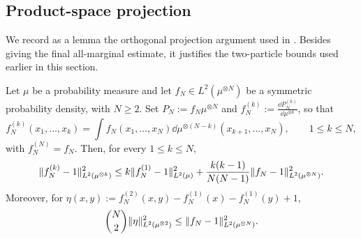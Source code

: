 \documentclass[11pt,reqno]{amsart}
\numberwithin{equation}{section}
\theoremstyle{plain}
\theoremstyle{remark}
\DeclarePairedDelimiter{\norm}{\lVert}{\rVert}
\begin{document}
\subsection{Product-space projection}
We record as a lemma the orthogonal projection argument used in \cite{DGRchaos}. Besides giving the final all-marginal estimate, it justifies the two-particle bounds used earlier in this section.

\begin{lemma}\label{lem:product-projection}
Let $\mu$ be a probability measure and let $f_N\in L^2(\mu^{\otimes N})$ be a symmetric probability density, with $N\ge2$. Set $P_N:=f_N\mu^{\otimes N}$ and $f_N^{(k)}:=\frac{\dd P_N^{(k)}}{\dd\mu^{\otimes k}}$, so that
\begin{equation}\label{eq:projection-marginal-identities}
 f_N^{(k)}(x_1,\ldots,x_k)
 =\int f_N(x_1,\ldots,x_N)\dd\mu^{\otimes(N-k)}(x_{k+1},\ldots,x_N),
 \qquad 1\le k\le N,
\end{equation}
with $f_N^{(N)}=f_N$. Then, for every $1\le k\le N$,
\begin{equation}\label{eq:projection-transfer}
 \norm{f_N^{(k)}-1}_{L^2(\mu^{\otimes k})}^2
 \le k\norm{f_N^{(1)}-1}_{L^2(\mu)}^2
       +\frac{k(k-1)}{N(N-1)}\norm{f_N-1}_{L^2(\mu^{\otimes N})}^2.
\end{equation}
Moreover, for $\eta(x,y):=f_N^{(2)}(x,y)-f_N^{(1)}(x)-f_N^{(1)}(y)+1$,
\begin{equation}\label{eq:projection-pair-bound}
 \binom N2\norm\eta_{L^2(\mu^{\otimes2})}^2
 \le\norm{f_N-1}_{L^2(\mu^{\otimes N})}^2.
\end{equation}
\end{lemma}
\end{document}
